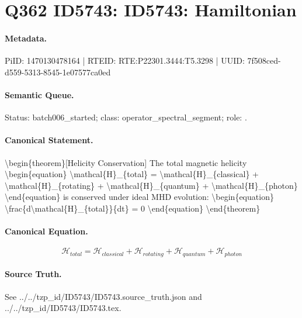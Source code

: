 \section*{Q362 ID5743: ID5743: Hamiltonian}
\paragraph{Metadata.}
PiID: 1470130478164 | RTEID: RTE:P22301.3444:T5.3298 | UUID: 7f508ced-d559-5313-8545-1e07577ca0ed

\paragraph{Semantic Queue.}
Status: batch006\_started; class: operator\_spectral\_segment; role: .

\paragraph{Canonical Statement.}
\textbackslash{}begin\{theorem\}[Helicity Conservation] The total magnetic helicity \textbackslash{}begin\{equation\} \textbackslash{}mathcal\{H\}\_\{total\} = \textbackslash{}mathcal\{H\}\_\{classical\} + \textbackslash{}mathcal\{H\}\_\{rotating\} + \textbackslash{}mathcal\{H\}\_\{quantum\} + \textbackslash{}mathcal\{H\}\_\{photon\} \textbackslash{}end\{equation\} is conserved under ideal MHD evolution: \textbackslash{}begin\{equation\} \textbackslash{}frac\{d\textbackslash{}mathcal\{H\}\_\{total\}\}\{dt\} = 0 \textbackslash{}end\{equation\} \textbackslash{}end\{theorem\}

\paragraph{Canonical Equation.}
\[
\begin{equation} \mathcal{H}_{total} = \mathcal{H}_{classical} + \mathcal{H}_{rotating} + \mathcal{H}_{quantum} + \mathcal{H}_{photon} \end{equation}
\]

\paragraph{Source Truth.}
See ../../tzp\_id/ID5743/ID5743.source\_truth.json and ../../tzp\_id/ID5743/ID5743.tex.
